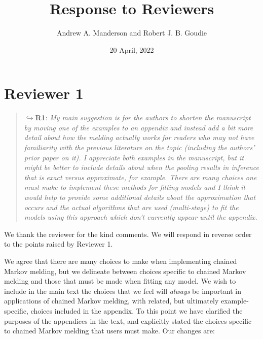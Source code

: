 \documentclass[
  10pt,
  a4paper,
]{article}
\title{Response to Reviewers}
\author{Andrew A. Manderson and Robert J. B. Goudie}
\date{20 April, 2022}
\begin{document}
\maketitle

\hypertarget{reviewer-1}{%
\section*{Reviewer 1}\label{reviewer-1}}

\begin{quote}
\(\hookrightarrow\)\textbf{R1}: \emph{My main suggestion is for the
authors to shorten the manuscript by moving one of the examples to an
appendix and instead add a bit more detail about how the melding
actually works for readers who may not have familiarity with the
previous literature on the topic (including the authors' prior paper on
it). I appreciate both examples in the manuscript, but it might be
better to include details about when the pooling results in inference
that is exact versus approximate, for example. There are many choices
one must make to implement these methods for fitting models and I think
it would help to provide some additional details about the approximation
that occurs and the actual algorithms that are used (multi-stage) to fit
the models using this approach which don't currently appear until the
appendix.}
\end{quote}

We thank the reviewer for the kind comments. We will respond in reverse
order to the points raised by Reviewer 1.

We agree that there are many choices to make when implementing chained
Markov melding, but we delineate between choices specific to chained
Markov melding and those that must be made when fitting any model. We
wish to include in the main text the choices that we feel will
\emph{always} be important in applications of chained Markov melding,
with related, but ultimately example-specific, choices included in the
appendix. To this point we have clarified the purposes of the appendices
in the text, and explicitly stated the choices specific to chained
Markov melding that users must make. Our changes are:
\end{document}
